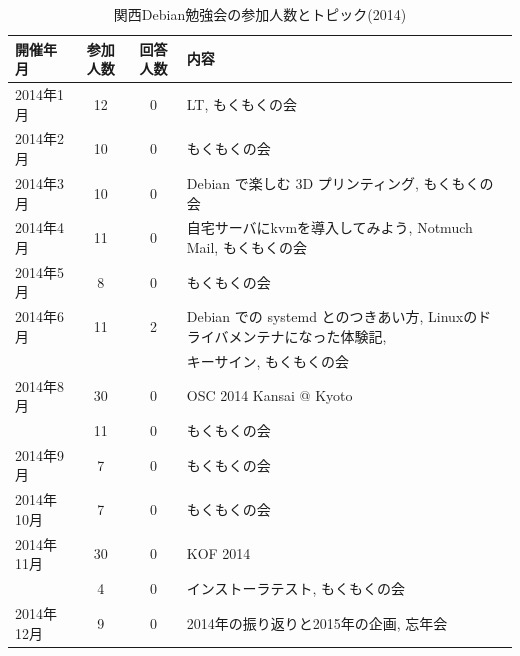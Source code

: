 \documentclass[mingoth,a4paper]{jsarticle}
\begin{document}
\begin{table}
    \caption{関西Debian勉強会の参加人数とトピック(2014)}
    \label{tab:count2014kansai}
    \begin{center}
      \begin{tabular}{|l|c|c|l|}
        \hline
        開催年月  & 参加人数 & 回答人数 & 内容 \\
        \hline
        2014年1月 &12        &0         & LT, もくもくの会 \\
        2014年2月 &10        &0         & もくもくの会 \\
        2014年3月 &10        &0         & Debian で楽しむ 3D プリンティング, もくもくの会 \\
        2014年4月 &11        &0         & 自宅サーバにkvmを導入してみよう, Notmuch Mail, もくもくの会 \\
        2014年5月 & 8        &0         & もくもくの会 \\
        2014年6月 &11        &2         & Debian での systemd とのつきあい方, Linuxのドライバメンテナになった体験記, \\
                  &          &          & キーサイン, もくもくの会 \\
        2014年8月 &30        &0         & OSC 2014 Kansai @ Kyoto \\
                  &11        &0         & もくもくの会 \\
        2014年9月 & 7        &0         & もくもくの会 \\
        2014年10月& 7        &0         & もくもくの会 \\
        2014年11月&30        &0         & KOF 2014 \\
                  & 4        &0         & インストーラテスト, もくもくの会 \\
        2014年12月& 9        &0         & 2014年の振り返りと2015年の企画, 忘年会 \\
        \hline
      \end{tabular}
    \end{center}
\end{table}


\clearpage

\end{document}
